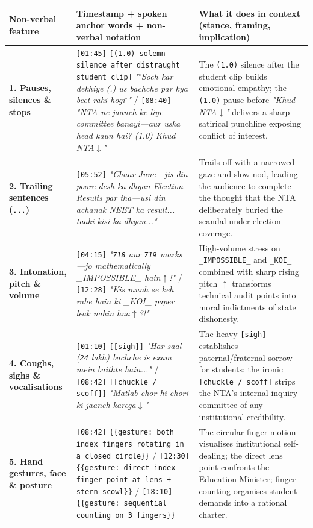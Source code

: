 \documentclass[10pt,a4paper]{article}
\begin{document}
\begin{longtable}{|p{}|p{}|p{}|}
\hline
Non-verbal feature & Timestamp + spoken anchor words + non-verbal notation & What it does in context (stance, framing, implication) \\ \hline \endhead
\textbf{1. Pauses, silences \& stops} & \texttt{[01:45]} \texttt{[(1.0) solemn silence after distraught student clip]} \textit{"$^\circ$Soch kar dekhiye (.) us bachche par kya beet rahi hogi$^\circ$"} / \texttt{[08:40]} \textit{"NTA ne jaanch ke liye committee banayi---aur uska head kaun hai? (1.0) Khud NTA$\downarrow$"} & The \texttt{(1.0)} silence after the student clip builds emotional empathy; the \texttt{(1.0)} pause before \textit{"Khud NTA$\downarrow$"} delivers a sharp satirical punchline exposing conflict of interest. \\ \hline
\textbf{2. Trailing sentences (\texttt{...})} & \texttt{[05:52]} \textit{"Chaar June---jis din poore desh ka dhyan Election Results par tha---usi din achanak NEET ka result... taaki kisi ka dhyan..."} & Trails off with a narrowed gaze and slow nod, leading the audience to complete the thought that the NTA deliberately buried the scandal under election coverage. \\ \hline
\textbf{3. Intonation, pitch \& volume} & \texttt{[04:15]} \textit{"\texttt{718} aur \texttt{719} marks---jo mathematically \_IMPOSSIBLE\_ hain$\uparrow$!"} / \texttt{[12:28]} \textit{"Kis munh se keh rahe hain ki \_KOI\_ paper leak nahin hua$\uparrow$?!"} & High-volume stress on \texttt{\_IMPOSSIBLE\_} and \texttt{\_KOI\_} combined with sharp rising pitch \texttt{$\uparrow$} transforms technical audit points into moral indictments of state dishonesty. \\ \hline
\textbf{4. Coughs, sighs \& vocalisations} & \texttt{[01:10]} \texttt{[[sigh]]} \textit{"Har saal (\texttt{24} lakh) bachche is exam mein baithte hain..."} / \texttt{[08:42]} \texttt{[[chuckle / scoff]]} \textit{"Matlab chor hi chori ki jaanch karega$\downarrow$"} & The heavy \texttt{[sigh]} establishes paternal/fraternal sorrow for students; the ironic \texttt{[chuckle / scoff]} strips the NTA's internal inquiry committee of any institutional credibility. \\ \hline
\textbf{5. Hand gestures, face \& posture} & \texttt{[08:42]} \texttt{\{\{gesture: both index fingers rotating in a closed circle\}\}} / \texttt{[12:30]} \texttt{\{\{gesture: direct index-finger point at lens + stern scowl\}\}} / \texttt{[18:10]} \texttt{\{\{gesture: sequential counting on 3 fingers\}\}} & The circular finger motion visualises institutional self-dealing; the direct lens point confronts the Education Minister; finger-counting organises student demands into a rational charter. \\ \hline
\end{longtable}
\end{document}
